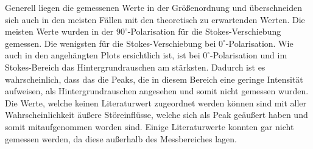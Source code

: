 Generell liegen die gemessenen Werte in der Größenordnung und überschneiden sich auch in den meisten Fällen mit den theoretisch zu erwartenden Werten.
Die meisten Werte wurden in der $90^\circ$-Polarisation für die Stokes-Verschiebung gemessen.
Die wenigsten für die Stokes-Verschiebung bei $0^\circ$-Polarisation.
Wie auch in den angehängten Plots ersichtlich ist, ist bei $0^\circ$-Polarisation und im Stokes-Bereich das Hintergrundrauschen am stärksten.
Dadurch ist es wahrscheinlich, dass das die Peaks, die in diesem Bereich eine geringe Intensität aufweisen, als Hintergrundrauschen angesehen und somit nicht gemessen wurden.\\
Die Werte, welche keinen Literaturwert zugeordnet werden können sind mit aller Wahrscheinlichkeit äußere Störeinflüsse, welche sich als Peak geäußert haben und somit mitaufgenommen worden sind.
Einige Literaturwerte konnten gar nicht gemessen werden, da diese außerhalb des Messbereiches lagen.